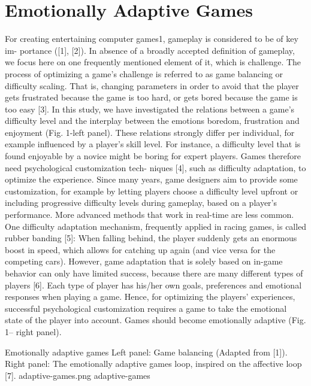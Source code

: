 \documentclass{uofsthesis-cs}
\begin{document}
\section{Emotionally Adaptive Games}

For creating entertaining computer games1, gameplay is considered to be of key im- portance ([1], [2]). In absence of a broadly accepted definition of gameplay, we focus here on one frequently mentioned element of it, which is challenge. The process of optimizing a game’s challenge is referred to as game balancing or difficulty scaling. That is, changing parameters in order to avoid that the player gets frustrated because the game is too hard, or gets bored because the game is too easy [3]. In this study, we have investigated the relations between a game's difficulty level and the interplay between the emotions boredom, frustration and enjoyment (Fig. 1-left panel). These 
relations strongly differ per individual, for example influenced by a player's skill level. For instance, a difficulty level that is found enjoyable by a novice might be boring for expert players. Games therefore need psychological customization tech- niques [4], such as difficulty adaptation, to optimize the experience. Since many years, game designers aim to provide some customization, for example by letting players choose a difficulty level upfront or including progressive difficulty levels during gameplay, based on a player’s performance.   More advanced methods that work in real-time are less common. One difficulty adaptation mechanism, frequently applied in racing games, is called rubber banding [5]: When falling behind, the player suddenly gets an enormous boost in speed, which allows for catching up again (and vice versa for the competing cars). However, game adaptation that is solely based on in-game behavior can only have limited success, because there are many different types of players [6]. Each type of player has his/her own goals, preferences and emotional responses when playing a game. Hence, for optimizing the players' experiences, successful psychological customization requires a game to take the emotional state of the player into account. Games should become emotionally adaptive (Fig. 1– right panel). 

\img
{Emotionally adaptive games}
{Left panel: Game balancing (Adapted from [1]). Right panel: The emotionally adaptive games loop, inspired on the affective loop [7]. }
{adaptive-games.png}
{adaptive-games}
\end{document}
